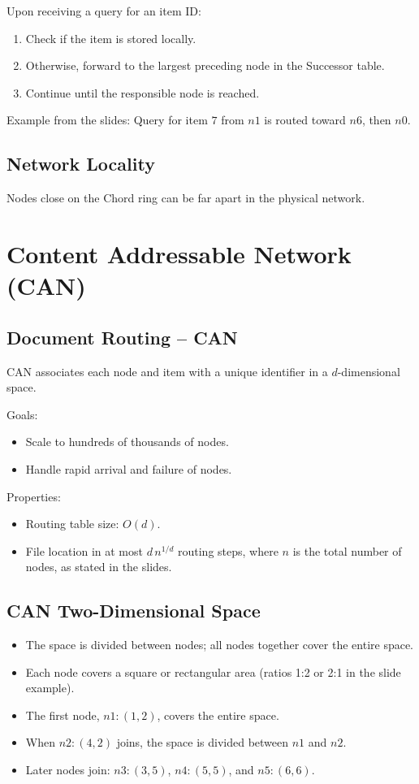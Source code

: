 \documentclass{article}
\begin{document}
Upon receiving a query for an item ID:
\begin{enumerate}
    \item Check if the item is stored locally.
    \item Otherwise, forward to the largest preceding node in the Successor table.
    \item Continue until the responsible node is reached.
\end{enumerate}

Example from the slides: Query for item \(7\) from \(n1\) is routed toward \(n6\), then \(n0\).

\subsection{Network Locality}

Nodes close on the Chord ring can be far apart in the physical network.

\section{Content Addressable Network (CAN)}

\subsection{Document Routing -- CAN}

CAN associates each node and item with a unique identifier in a \(d\)-dimensional space.

Goals:
\begin{itemize}
    \item Scale to hundreds of thousands of nodes.
    \item Handle rapid arrival and failure of nodes.
\end{itemize}

Properties:
\begin{itemize}
    \item Routing table size: \(O(d)\).
    \item File location in at most \(d\,n^{1/d}\) routing steps, where \(n\) is the total number of nodes, as stated in the slides.
\end{itemize}

\subsection{CAN Two-Dimensional Space}
\begin{itemize}
    \item The space is divided between nodes; all nodes together cover the entire space.
    \item Each node covers a square or rectangular area (ratios 1:2 or 2:1 in the slide example).
    \item The first node, \(n1:(1,2)\), covers the entire space.
    \item When \(n2:(4,2)\) joins, the space is divided between \(n1\) and \(n2\).
    \item Later nodes join: \(n3:(3,5)\), \(n4:(5,5)\), and \(n5:(6,6)\).
\end{itemize}
\end{document}
